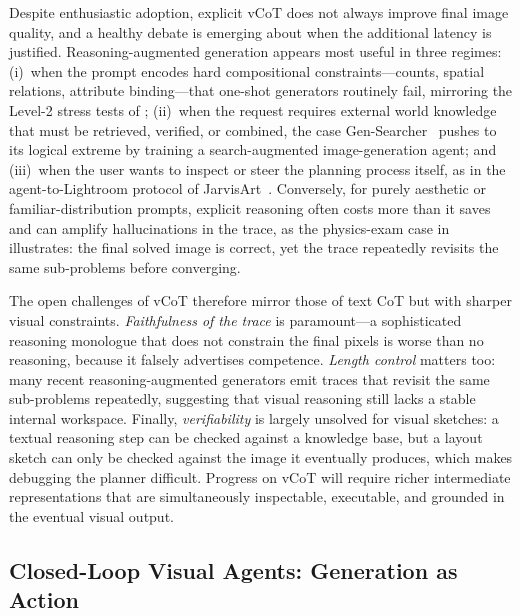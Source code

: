 \documentclass{llmxive}
\begin{document}
Despite enthusiastic adoption, explicit vCoT does not always improve final image quality, and a healthy debate is emerging about when the additional latency is justified. Reasoning-augmented generation appears most useful in three regimes: (i)~when the prompt encodes hard compositional constraints---counts, spatial relations, attribute binding---that one-shot generators routinely fail, mirroring the Level-2 stress tests of ; (ii)~when the request requires external world knowledge that must be retrieved, verified, or combined, the case Gen-Searcher~\citep{feng2026gen} pushes to its logical extreme by training a search-augmented image-generation agent; and (iii)~when the user wants to inspect or steer the planning process itself, as in the agent-to-Lightroom protocol of JarvisArt~\citep{lin2025jarvisart}. Conversely, for purely aesthetic or familiar-distribution prompts, explicit reasoning often costs more than it saves and can amplify hallucinations in the trace, as the physics-exam case in  illustrates: the final solved image is correct, yet the trace repeatedly revisits the same sub-problems before converging.

The open challenges of vCoT therefore mirror those of text CoT but with sharper visual constraints. \emph{Faithfulness of the trace} is paramount---a sophisticated reasoning monologue that does not constrain the final pixels is worse than no reasoning, because it falsely advertises competence. \emph{Length control} matters too: many recent reasoning-augmented generators emit traces that revisit the same sub-problems repeatedly, suggesting that visual reasoning still lacks a stable internal workspace. Finally, \emph{verifiability} is largely unsolved for visual sketches: a textual reasoning step can be checked against a knowledge base, but a layout sketch can only be checked against the image it eventually produces, which makes debugging the planner difficult. Progress on vCoT will require richer intermediate representations that are simultaneously inspectable, executable, and grounded in the eventual visual output.

\subsection{Closed-Loop Visual Agents: Generation as Action}
\label{subsec:closed_loop_agents}
\end{document}
